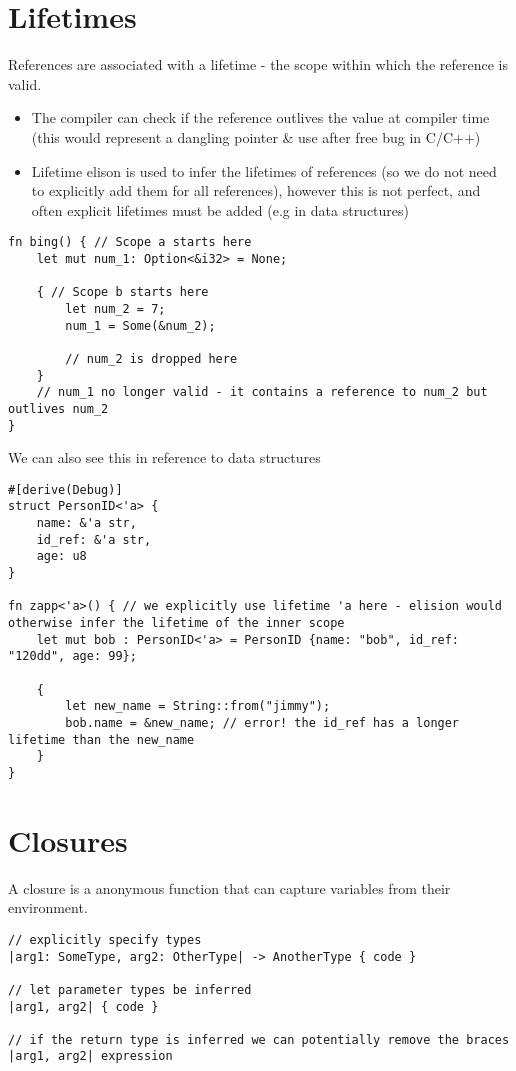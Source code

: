 \section{Lifetimes}
References are associated with a lifetime - the scope within which the reference is valid.
\begin{itemize}
    \item The compiler can check if the reference outlives the value at compiler time (this would represent a dangling pointer \& use after free bug in C/C++)
    \item Lifetime elison is used to infer the lifetimes of references (so we do not need to explicitly add them for all references), however this is not perfect, and often explicit lifetimes must be added (e.g in data structures)
\end{itemize}

\begin{verbatim}
fn bing() { // Scope a starts here
    let mut num_1: Option<&i32> = None;

    { // Scope b starts here
        let num_2 = 7;
        num_1 = Some(&num_2);

        // num_2 is dropped here
    }
    // num_1 no longer valid - it contains a reference to num_2 but outlives num_2
}
\end{verbatim}
We can also see this in reference to data structures
\begin{verbatim}
#[derive(Debug)]
struct PersonID<'a> {
    name: &'a str,
    id_ref: &'a str,
    age: u8
}

fn zapp<'a>() { // we explicitly use lifetime 'a here - elision would otherwise infer the lifetime of the inner scope
    let mut bob : PersonID<'a> = PersonID {name: "bob", id_ref: "120dd", age: 99};

    {
        let new_name = String::from("jimmy");
        bob.name = &new_name; // error! the id_ref has a longer lifetime than the new_name
    }
}
\end{verbatim}

\section{Closures}
A closure is a anonymous function that can capture variables from their environment.
\begin{verbatim}
// explicitly specify types
|arg1: SomeType, arg2: OtherType| -> AnotherType { code }

// let parameter types be inferred
|arg1, arg2| { code }

// if the return type is inferred we can potentially remove the braces
|arg1, arg2| expression
\end{verbatim}

